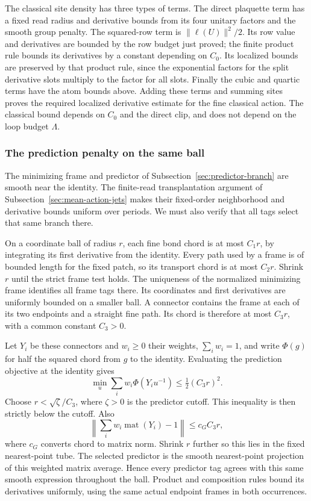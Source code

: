 The classical site density has three types of terms. The direct
plaquette term has a fixed read radius and derivative bounds from
its four unitary factors and the smooth group penalty. The
squared-row term is $\|\ell(U)\|^2/2$. Its row value and derivatives
are bounded by the row budget just proved; the finite product rule
bounds its derivatives by a constant depending on $C_0$. Its
localized bounds are preserved by that product rule, since the
exponential factors for the split derivative slots multiply to the
factor for all slots. Finally the cubic and quartic terms have the
atom bounds above. Adding these terms and summing sites proves
the required localized derivative estimate for the fine classical
action. The classical bound depends on $C_0$ and the direct clip,
and does not depend on the loop budget $\Lambda$.

\subsubsection{The prediction penalty on the same ball}
The minimizing frame and predictor of
Subsection~\ref{sec:predictor-branch} are smooth near the identity.
The finite-read transplantation argument of
Subsection~\ref{sec:mean-action-jets} makes their fixed-order
neighborhood and derivative bounds uniform over periods. We must
also verify that all tags select that same branch there.

On a coordinate ball of radius $r$, each fine bond chord is at
most $C_1r$, by integrating its first derivative from the identity.
Every path used by a frame is of bounded length for the fixed
patch, so its transport chord is at most $C_2r$. Shrink $r$ until
the strict frame test holds. The uniqueness of the normalized
minimizing frame identifies all frame tags there. Its coordinates
and first derivatives are uniformly bounded on a smaller ball.
A connector contains the frame at each of its two endpoints and
a straight fine path. Its chord is therefore at most $C_3r$,
with a common constant $C_3>0$.

Let $Y_i$ be these connectors and $w_i\ge0$ their weights,
$\sum_iw_i=1$, and write $\Phi(g)$ for half the squared chord from $g$ to the identity. Evaluating the prediction objective at the identity gives
\[
       \min_u\sum_iw_i\Phi(Y_i u^{-1})
          \le\tfrac12(C_3r)^2.
\]
Choose $r<\sqrt{\zeta}/C_3$, where $\zeta>0$ is the predictor
cutoff. This inequality is then strictly below the cutoff. Also
\[
       \left\|\sum_iw_i\operatorname{mat}(Y_i)-1\right\|
                       \le c_GC_3r,
\]
where $c_G$ converts chord to matrix norm. Shrink $r$ further so
this lies in the fixed nearest-point tube. The selected predictor
is the smooth nearest-point projection of this weighted matrix
average. Hence every predictor tag agrees with this same smooth
expression throughout the ball. Product and composition rules
bound its derivatives uniformly, using the same actual endpoint
frames in both occurrences.

